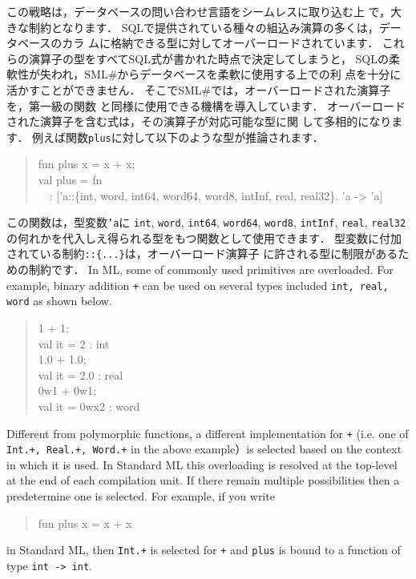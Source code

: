 \documentclass{jbook}
\newcommand{\smlsharp}{SML\#}
\newcommand{\myem}{\mbox{\ \ }}
\begin{document}
	この戦略は，データベースの問い合わせ言語をシームレスに取り込む上
で，大きな制約となります．
	SQLで提供されている種々の組込み演算の多くは，データベースのカラ
ムに格納できる型に対してオーバーロードされています．
	これらの演算子の型をすべてSQL式が書かれた時点で決定してしまうと，
SQLの柔軟性が失われ，\smlsharp{}からデータベースを柔軟に使用する上での利
点を十分に活かすことができません．
	そこで\smlsharp{}では，オーバーロードされた演算子を，第一級の関数
と同様に使用できる機構を導入しています．
	オーバーロードされた演算子を含む式は，その演算子が対応可能な型に関
して多相的になります．
	例えば関数{\tt plus}に対して以下のような型が推論されます．
\begin{tt}
\begin{quote}
fun plus x = x + x;\\
val plus = fn\\
\myem  : ['a::\{int, word, int64, word64, word8, intInf, real, real32\}. 'a -> 'a]
\end{quote}
\end{tt}
この関数は，型変数{\tt 'a}に
{\tt int}, 
{\tt word}, 
{\tt int64},
{\tt word64},
{\tt word8},
{\tt intInf},
{\tt real},
{\tt real32}
の何れかを代入しえ得られる型をもつ関数として使用できます．
	型変数に付加されている制約{\tt ::\{...\}}は，オーバーロード演算子
に許される型に制限があるための制約です．
\else%
	In ML, some of commonly used primitives are overloaded.
	For example, binary addition {\tt +} can be used on several
types included {\tt int, real, word} as shown below.
\begin{tt}
\begin{quote}
1 + 1;\\
val it = 2 : int\\
1.0 + 1.0;\\
val it = 2.0 : real\\
0w1 + 0w1;\\
val it = 0wx2 : word
\end{quote}
\end{tt}
	Different from polymorphic functions, a different implementation
for {\tt +} (i.e. one of {\tt Int.+, Real.+, Word.+} in the above
example）is selected based on the context in which it is used. 
	In Standard ML this overloading is resolved at the top-level
at the end of each compilation unit.
	If there remain multiple possibilities then a predetermine one
is selected.
	For example, if you write 
\begin{tt}
\begin{quote}
fun plus x = x + x
\end{quote}
\end{tt}
in Standard ML, then {\tt Int.+}  is selected for {\tt +} and {\tt plus}
is bound to a function of type {\tt int -> int}.
	
\end{document}
